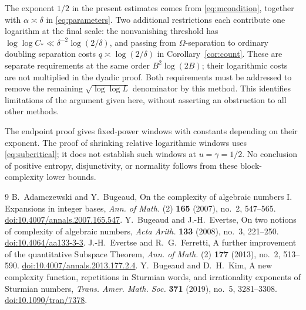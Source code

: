 \documentclass[11pt]{article}
\numberwithin{equation}{section}
\theoremstyle{remark}\newtheorem{remark}[theorem]{Remark}
\begin{document}
The exponent $1/2$ in the present estimates comes from
\eqref{eq:mcondition}, together with $\alpha\asymp\delta$ in
\eqref{eq:parameters}. Two additional restrictions each contribute
one logarithm at the final scale: the nonvanishing threshold has
$\log\log C_*\ll\delta^{-2}\log(2/\delta)$, and passing from
$\Omega$-separation to ordinary doubling separation costs
$q\asymp\log(2/\delta)$ in Corollary~\ref{cor:count}.
These are separate requirements at the same order
$B^2\log(2B)$; their logarithmic costs are not multiplied in the
dyadic proof. Both requirements must be addressed to remove the
remaining $\sqrt{\log\log L}$ denominator by this method.
This identifies limitations of the argument given here, without
asserting an obstruction to all other methods.

The endpoint proof gives fixed-power windows with constants depending
on their exponent. The proof of shrinking relative logarithmic
windows uses \eqref{eq:subcritical}; it does not establish such windows
at $u=\gamma=1/2$. No conclusion of positive entropy, disjunctivity,
or normality follows from these block-complexity lower bounds.

\begin{thebibliography}{9}
 B.~Adamczewski and Y.~Bugeaud,
On the complexity of algebraic numbers I. Expansions in integer bases,
\emph{Ann. of Math.} (2) \textbf{165} (2007), no.~2, 547--565.
\href{https://doi.org/10.4007/annals.2007.165.547}{doi:10.4007/annals.2007.165.547}.
 Y.~Bugeaud and J.-H.~Evertse,
On two notions of complexity of algebraic numbers,
\emph{Acta Arith.} \textbf{133} (2008), no.~3, 221--250.
\href{https://doi.org/10.4064/aa133-3-3}{doi:10.4064/aa133-3-3}.
 J.-H.~Evertse and R.~G.~Ferretti,
A further improvement of the quantitative Subspace Theorem,
\emph{Ann. of Math.} (2) \textbf{177} (2013), no.~2, 513--590.
\href{https://doi.org/10.4007/annals.2013.177.2.4}{doi:10.4007/annals.2013.177.2.4}.
 Y.~Bugeaud and D.~H.~Kim,
A new complexity function, repetitions in Sturmian words, and
irrationality exponents of Sturmian numbers,
\emph{Trans. Amer. Math. Soc.} \textbf{371} (2019), no.~5, 3281--3308.
\href{https://doi.org/10.1090/tran/7378}{doi:10.1090/tran/7378}.
\end{thebibliography}
\end{document}
